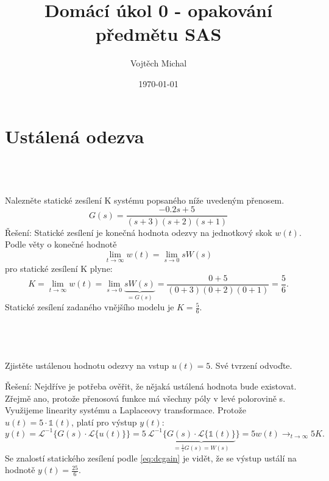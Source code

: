 \documentclass[twoside]{article}
\title{Domácí úkol 0 - opakování předmětu SAS}
\author{Vojtěch Michal}
\date{\today}
\begin{document}
\maketitle

\section{Ustálená odezva}
\label{sec:ukol1}

\subsection{~}
\label{sec:ukol1:1}
Nalezněte statické zesílení K systému popsaného níže uvedeným přenosem.
\begin{equation}
	G(s) = \frac{-0.2s+5}{(s+3)(s+2)(s+1)}
\end{equation}
Řešení: Statické zesílení je konečná hodnota odezvy na jednotkový skok $w(t)$. Podle věty o konečné hodnotě
\begin{equation}
	\lim_{t \to \infty}w(t) = \lim_{s \to 0}sW(s)
\end{equation}
pro statické zesílení K plyne:
\begin{equation}
	\label{eq:dcgain}
	K = \lim_{t \to \infty}w(t) = \lim_{s \to 0}{\underbrace{sW(s)}_{=G(s)}} = \frac{0+5}{(0+3)(0+2)(0+1)} = \frac{5}{6}.
\end{equation}
Statické zesílení zadaného vnějšího modelu je $K = \frac{5}{6}$.

\subsection{~}
Zjistěte ustálenou hodnotu odezvy na vstup $u (t) = 5$. Své tvrzení odvoďte.

Řešení: Nejdříve je potřeba ověřit, že nějaká ustálená hodnota bude existovat. Zřejmě ano, protože přenosová funkce má všechny póly
v levé polorovině s. Využijeme linearity systému a Laplaceovy transformace. Protože $u(t) = 5\cdot \mathbb{1}(t)$, platí pro výstup $y(t)$:
\begin{equation}
	y(t) = \mathcal{L}^{-1}\{G(s) \cdot \mathcal{L}\{u(t)\}\} = 5~\mathcal{L}^{-1}\{\underbrace{G(s) \cdot \mathcal{L}\{\mathbb{1}(t)\}}_{= \frac{1}{s}G(s)=W(s)}\}
	= 5 w(t) \longrightarrow_{t \to \infty} 5 K.
\end{equation}
Se znalostí statického zesílení podle \eqref{eq:dcgain} je vidět, že se výstup ustálí na hodnotě $y(t)=\frac{25}{6}$.
\end{document}
